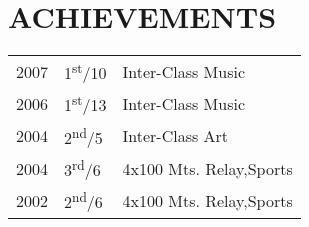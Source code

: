\documentclass[]{deedy-resume-openfont}
\begin{document}
\begin{minipage}[t]{0.33\textwidth}

\section{ACHIEVEMENTS}
\begin{tabular}{rll}
2007 & 1\textsuperscript{st}/10 & Inter-Class Music\\
2006 & 1\textsuperscript{st}/13 & Inter-Class Music\\
2004 & 2\textsuperscript{nd}/5 & Inter-Class Art\\
2004 & 3\textsuperscript{rd}/6 & 4x100 Mts. Relay,Sports\\
2002 & 2\textsuperscript{nd}/6 & 4x100 Mts. Relay,Sports
\end{tabular}
\sectionsep






%

\end{minipage}
\hfill
\end{document}

